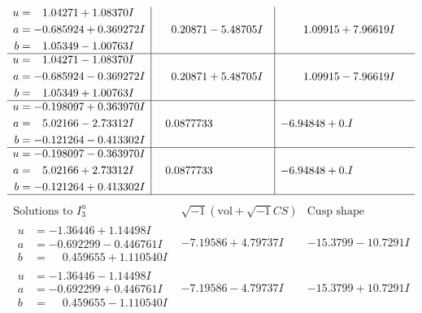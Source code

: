 \documentclass[1p]{elsarticle_modified}
\theoremstyle{definition}
\newcommand{\I}{\sqrt{-1}}
\begin{document}
$$\begin{array}{c|c|c}
\begin{aligned}
u &= \phantom{-}1.04271 + 1.08370 I \\
a &= -0.685924 + 0.369272 I \\
b &= \phantom{-}1.05349 - 1.00763 I\end{aligned}
 & \phantom{-}0.20871 - 5.48705 I & \phantom{-}1.09915 + 7.96619 I \\ \hline\begin{aligned}
u &= \phantom{-}1.04271 - 1.08370 I \\
a &= -0.685924 - 0.369272 I \\
b &= \phantom{-}1.05349 + 1.00763 I\end{aligned}
 & \phantom{-}0.20871 + 5.48705 I & \phantom{-}1.09915 - 7.96619 I \\ \hline\begin{aligned}
u &= -0.198097 + 0.363970 I \\
a &= \phantom{-}5.02166 - 2.73312 I \\
b &= -0.121264 - 0.413302 I\end{aligned}
 & \phantom{-}0.0877733\phantom{ +0.000000I} & -6.94848 + 0. I\phantom{ +0.000000I} \\ \hline\begin{aligned}
u &= -0.198097 - 0.363970 I \\
a &= \phantom{-}5.02166 + 2.73312 I \\
b &= -0.121264 + 0.413302 I\end{aligned}
 & \phantom{-}0.0877733\phantom{ +0.000000I} & -6.94848 + 0. I\phantom{ +0.000000I}\\
 \hline 
 \end{array}$$\newpage$$\begin{array}{c|c|c}  
\text{Solutions to }I^u_{3}& \I (\text{vol} + \sqrt{-1}CS) & \text{Cusp shape}\\
 \hline 
\begin{aligned}
u &= -1.36446 + 1.14498 I \\
a &= -0.692299 - 0.446761 I \\
b &= \phantom{-}0.459655 + 1.110540 I\end{aligned}
 & -7.19586 + 4.79737 I & -15.3799 - 10.7291 I \\ \hline\begin{aligned}
u &= -1.36446 - 1.14498 I \\
a &= -0.692299 + 0.446761 I \\
b &= \phantom{-}0.459655 - 1.110540 I\end{aligned}
 & -7.19586 - 4.79737 I & -15.3799 + 10.7291 I \\ \hline\begin{aligned}

\end{aligned}
\end{array}$$
\end{document}
